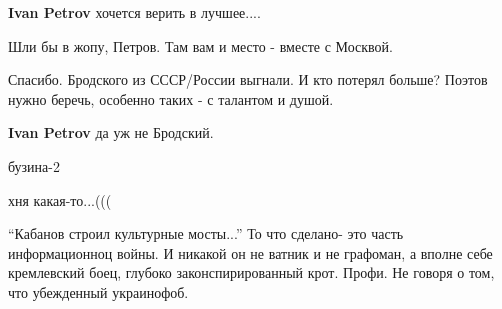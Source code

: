 \begin{itemize}
\begin{itemize} %
\textbf{Ivan Petrov} хочется верить в лучшее....

Шли бы в жопу, Петров. Там вам и место - вместе с Москвой.
\end{itemize} %

Спасибо. Бродского из СССР/России выгнали. И кто потерял больше? Поэтов нужно беречь, особенно таких - с талантом и душой.

\textbf{Ivan Petrov} да уж не Бродский.

бузина-2

хня какая-то...(((


\enquote{Кабанов строил культурные мосты...} То что сделано- это часть информационноц
войны. И никакой он не ватник и не графоман, а вполне себе кремлевский боец,
глубоко законспирированный крот. Профи. Не говоря о том, что убежденный
украинофоб.



\end{itemize} %
